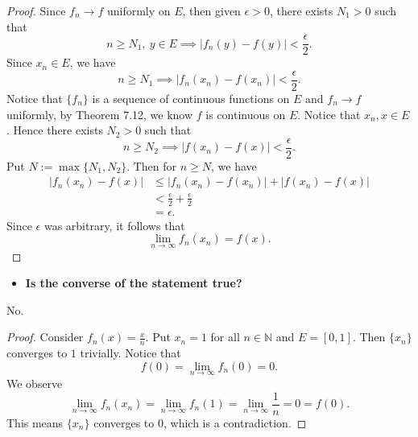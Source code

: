 \begin{Exercise}
	\begin{proof}
		Since $f_n\to f$ uniformly on $E$, then given $\epsilon>0$, there exists $N_1>0$ such that
		$$
		n\geq N_1,\ y\in E \implies |f_n(y) - f(y)| < \frac{\epsilon}{2}.
		$$
		Since $x_n\in E$, we have
		$$
		n\geq N_1 \implies |f_n(x_n) - f(x_n)| < \frac{\epsilon}{2}.
		$$
		Notice that $\{f_n\}$ is a sequence of continuous functions on $E$ and $f_n\to f$ uniformly, by Theorem 7.12, we know $f$ is continuous on $E$.
		Notice that $x_n, x\in E$.
		Hence there exists $N_2 > 0$ such that
		$$
		n\geq N_2 \implies |f(x_n) - f(x)| < \frac{\epsilon}{2}.
		$$
		Put $N := \max\{N_1, N_2\}$.
		Then for $n\geq N$, we have
		\begin{align*}
		|f_n(x_n) - f(x)|
		&\leq |f_n(x_n) - f(x_n)| + |f(x_n) - f(x)| \\
		&< \frac{\epsilon}{2} + \frac{\epsilon}{2} \\
		&= \epsilon.
		\end{align*}
		Since $\epsilon$ was arbitrary, it follows that
		$$
		\lim_{n\to\infty} f_n(x_n) = f(x).
		$$
	\end{proof}
	
	\begin{itemize}
		\item \textbf{Is the converse of the statement true?}
	\end{itemize}
	\begin{answer}
		No.
	\end{answer}
	\begin{proof}
		Consider $f_n(x) = \frac{x}{n}$.
		Put $x_n = 1$ for all $n\in\mathbb{N}$ and $E = [0,1]$.
		Then $\{x_n\}$ converges to $1$ trivially.
		Notice that 
		$$
		f(0) = \lim_{n\to\infty} f_n(0) = 0.
		$$
		We observe
		$$
		\lim_{n\to\infty}f_n(x_n)
		= \lim_{n\to\infty}f_n(1)
		= \lim_{n\to\infty} \frac{1}{n}
		= 0
		= f(0).
		$$
		This means $\{x_n\}$ converges to $0$, which is a contradiction.
	\end{proof}
\end{Exercise}